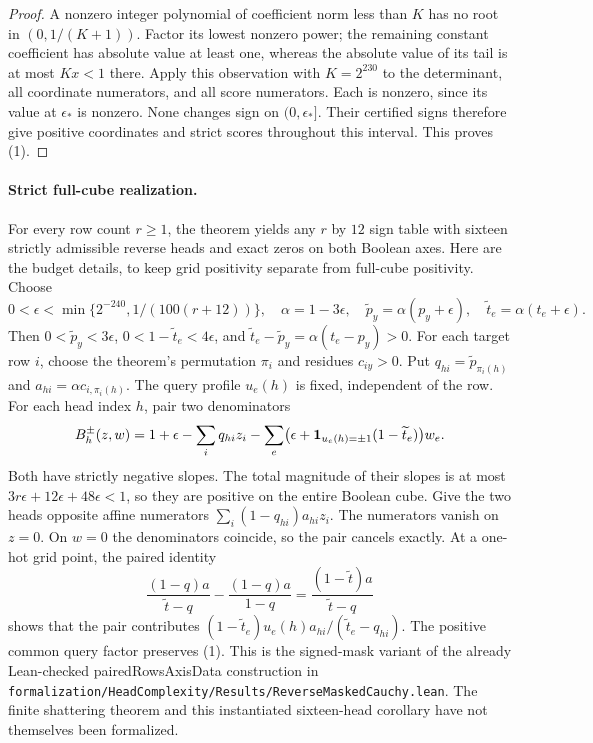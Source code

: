 \documentclass[11pt]{article}
\begin{document}
\begin{proof}
A nonzero integer polynomial of coefficient norm less than $K$ has no
root in $(0,1/(K+1))$. Factor its lowest nonzero power; the remaining
constant coefficient has absolute value at least one, whereas the
absolute value of its tail is at most $Kx<1$ there. Apply this observation
with $K=2^{230}$ to the determinant, all coordinate numerators, and all
score numerators. Each is nonzero, since its value at $\epsilon_*$ is
nonzero. None changes sign on $(0,\epsilon_*]$. Their certified signs
therefore give positive coordinates and strict scores throughout this
interval. This proves (1).
\end{proof}

\paragraph{Strict full-cube realization.}
For every row count $r\geq1$, the theorem yields any $r$ by $12$ sign
table with sixteen strictly admissible reverse heads and exact zeros
on both Boolean axes. Here are the budget details, to keep grid positivity
separate from full-cube positivity.
Choose
\[
 0<\epsilon<\min\{2^{-240},1/(100(r+12))\},\quad
 \alpha=1-3\epsilon,\quad
 \widetilde p_y=\alpha(p_y+\epsilon),\quad
 \widetilde t_e=\alpha(t_e+\epsilon).
\]
Then $0<\widetilde p_y<3\epsilon$,
$0<1-\widetilde t_e<4\epsilon$, and
$\widetilde t_e-\widetilde p_y=\alpha(t_e-p_y)>0$.
For each target row $i$, choose the theorem's permutation $\pi_i$ and
residues $c_{iy}>0$. Put $q_{hi}=\widetilde p_{\pi_i(h)}$ and
$a_{hi}=\alpha c_{i,\pi_i(h)}$. The query profile $u_e(h)$ is fixed,
independent of the row. For each head index $h$, pair two denominators
\[
 B_h^\pm(z,w)=1+\epsilon-\sum_i q_{hi}z_i
 -\sum_e\bigl(\epsilon+
       {\bf1}_{u_e(h)=\pm1}(1-\widetilde t_e)\bigr)w_e.
\]
Both have strictly negative slopes. The total magnitude of their slopes
is at most $3r\epsilon+12\epsilon+48\epsilon<1$, so they are positive
on the entire Boolean cube. Give the two heads opposite affine
numerators $\sum_i(1-q_{hi})a_{hi}z_i$.
The numerators vanish on $z=0$. On $w=0$ the denominators coincide,
so the pair cancels exactly. At a one-hot grid point, the paired identity
\[
 \frac{(1-q)a}{\widetilde t-q}-\frac{(1-q)a}{1-q}
 =\frac{(1-\widetilde t)a}{\widetilde t-q}
\]
shows that the pair contributes
$(1-\widetilde t_e)u_e(h)a_{hi}/(\widetilde t_e-q_{hi})$.
The positive common query factor preserves (1). This is the signed-mask
variant of the already Lean-checked pairedRowsAxisData construction in
\texttt{formalization/HeadComplexity/Results/ReverseMaskedCauchy.lean}.
The finite shattering theorem and this instantiated sixteen-head
corollary have not themselves been formalized.
\end{document}
